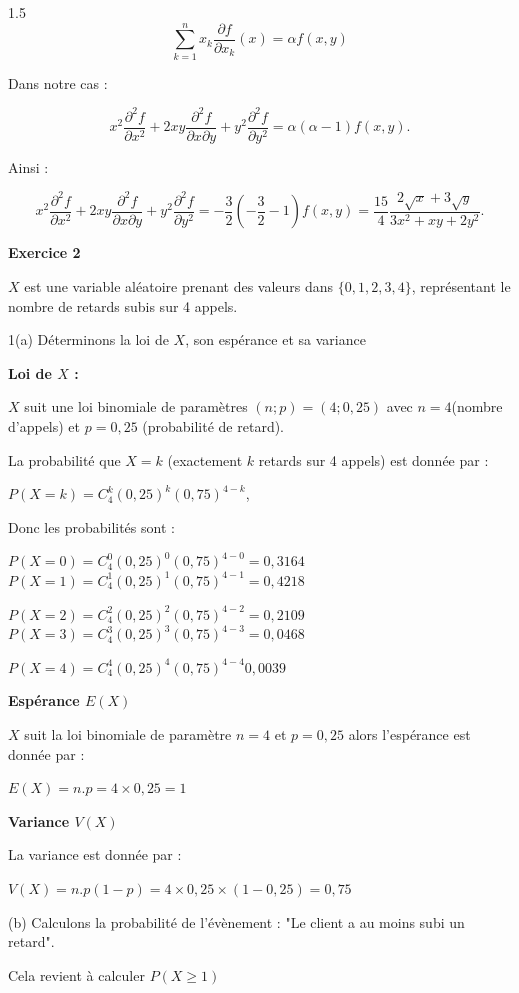 \documentclass[12pt]{article}
\begin{document}
\begin{spacing}{1.5}
\[\sum_{k=1}^{n}x_k \frac{\partial f}{\partial x_k}(x)=\alpha f(x,y)\]


Dans notre cas :

\[
x^2 \frac{\partial^2 f}{\partial x^2} + 2xy \frac{\partial^2 f}{\partial x \partial y} + y^2 \frac{\partial^2 f}{\partial y^2}=\alpha(\alpha-1)f(x,y).
\]

Ainsi : 

\[
x^2 \frac{\partial^2 f}{\partial x^2} + 2xy \frac{\partial^2 f}{\partial x \partial y} + y^2 \frac{\partial^2 f}{\partial y^2}=-\frac{3}{2}(-\frac{3}{2}-1)f(x,y)=\frac{15}{4}\frac{2\sqrt{x} + 3\sqrt{y}}{3x^2 + xy + 2y^2}.
\]






\medskip
\textbf{Exercice 2}

$X$ est une variable aléatoire prenant des valeurs dans $\{0,1,2,3,4\}$, représentant le nombre de retards subis sur 4 appels.

1(a) Déterminons la loi de 
$X$, son espérance et sa variance

\textbf{Loi de $X$ :}

$X$ suit une loi binomiale de paramètres $(n;p)=(4;0,25)$ avec $n=4$(nombre d'appels) et $p=0,25$ (probabilité de retard).

La probabilité que $X=k$ (exactement $k$ retards sur 4 appels) est donnée par :

$P(X=k)=C_4^k(0,25)^k(0,75)^{4-k}$, 

Donc les probabilités sont :

$P(X=0)=C_4^0(0,25)^0(0,75)^{4-0}=0,3164$       $P(X=1)=C_4^1(0,25)^1(0,75)^{4-1}=0,4218$

$P(X=2)=C_4^2(0,25)^2(0,75)^{4-2}=0,2109$
   $P(X=3)=C_4^3(0,25)^3(0,75)^{4-3}=0,0468$

$P(X=4)=C_4^4(0,25)^4(0,75)^{4-4}0,0039$

\medskip
\textbf{Espérance $E(X)$}

$X$ suit la loi binomiale de paramètre $n=4$ et $p=0,25$ alors l'espérance est donnée par :

$E(X)=n.p=4\times 0,25=1$

\medskip
\textbf{Variance $V(X)$}

La variance est donnée par :

$V(X)=n.p(1-p)=4\times 0,25\times (1-0,25)=0,75$

(b) Calculons la probabilité de l'évènement : "Le client a au moins subi un retard".

Cela revient à calculer $P(X\geq 1)$


\end{spacing}
\end{document}
